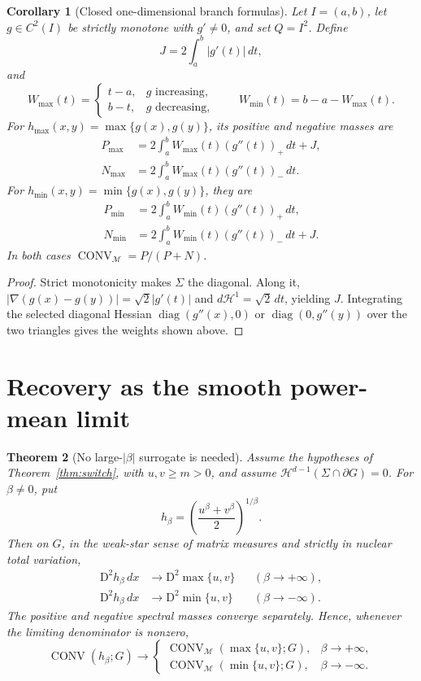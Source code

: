 \documentclass[11pt]{article}
\newtheorem{theorem}{Theorem}[section]
\newtheorem{corollary}[theorem]{Corollary}
\newcommand{\M}{\mathcal M}
\newcommand{\Hess}{\mathrm D^2}
\newcommand{\Conv}{\operatorname{CONV}}
\begin{document}
\begin{corollary}[Closed one-dimensional branch formulas]
\label{cor:branch}
Let \(I=(a,b)\), let \(g\in C^2(I)\) be strictly monotone with \(g'\ne0\), and
set \(Q=I^2\).  Define
\[
 J=2\int_a^b|g'(t)|\,dt,
\]
and
\[
 W_{\max}(t)=
 \begin{cases}t-a,&g\text{ increasing},\\ b-t,&g\text{ decreasing},\end{cases}
 \qquad
 W_{\min}(t)=b-a-W_{\max}(t).
\]
For \(h_{\max}(x,y)=\max\{g(x),g(y)\}\), its positive and negative masses are
\begin{align*}
 P_{\max}&=2\int_a^b W_{\max}(t)(g''(t))_+\,dt+J,\\
 N_{\max}&=2\int_a^b W_{\max}(t)(g''(t))_-\,dt.
\end{align*}
For \(h_{\min}(x,y)=\min\{g(x),g(y)\}\), they are
\begin{align*}
 P_{\min}&=2\int_a^b W_{\min}(t)(g''(t))_+\,dt,\\
 N_{\min}&=2\int_a^b W_{\min}(t)(g''(t))_-\,dt+J.
\end{align*}
In both cases \(\Conv_{\M}=P/(P+N)\).
\end{corollary}

\begin{proof}
Strict monotonicity makes \(\Sigma\) the diagonal.  Along it,
\(|\nabla(g(x)-g(y))|=\sqrt2|g'(t)|\) and
\(d\mathcal H^1=\sqrt2\,dt\), yielding \(J\).  Integrating the selected
diagonal Hessian \(\operatorname{diag}(g''(x),0)\) or
\(\operatorname{diag}(0,g''(y))\) over the two triangles gives the weights
shown above.
\end{proof}

\section{Recovery as the smooth power-mean limit}

\begin{theorem}[No large-\(|\beta|\) surrogate is needed]
\label{thm:limit}
Assume the hypotheses of Theorem~\ref{thm:switch}, with \(u,v\ge m>0\), and
assume \(\mathcal H^{d-1}(\Sigma\cap\partial G)=0\).  For \(\beta\ne0\), put
\[
 h_\beta=\left(\frac{u^\beta+v^\beta}{2}\right)^{1/\beta}.
\]
Then on \(G\), in the weak-star sense of matrix measures and strictly in
nuclear total variation,
\begin{align*}
 \Hess h_\beta\,dx&\longrightarrow \Hess\max\{u,v\}
     &&(\beta\to+\infty),\\
 \Hess h_\beta\,dx&\longrightarrow \Hess\min\{u,v\}
     &&(\beta\to-\infty).
\end{align*}
The positive and negative spectral masses converge separately.  Hence,
whenever the limiting denominator is nonzero,
\[
 \Conv(h_\beta;G)\longrightarrow
 \begin{cases}
 \Conv_{\M}(\max\{u,v\};G),&\beta\to+\infty,\\
 \Conv_{\M}(\min\{u,v\};G),&\beta\to-\infty.
 \end{cases}                                             \tag{5.1}
\]
\end{theorem}
\end{document}
